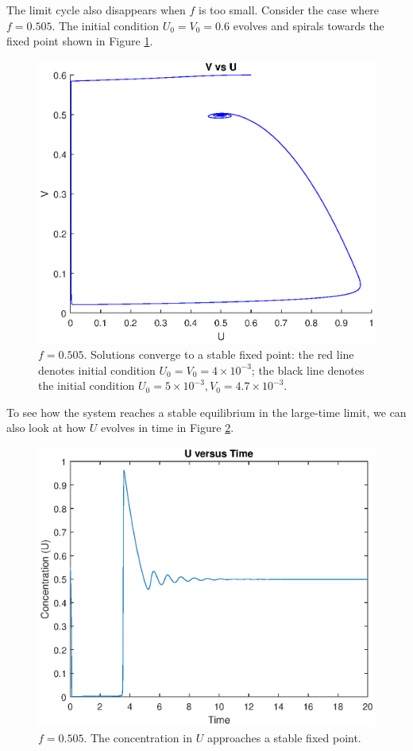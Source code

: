 \documentclass[twocolumn,amsmath,amssymb,aps]{revtex4}
\begin{document}
The limit cycle also disappears when $f$ is too small. Consider the case where $f = 0.505$. The initial condition $U_0 = V_0 = 0.6$ evolves and spirals towards the fixed point shown in Figure \ref{fig:hopf2}.
\begin{figure}[!htb]
	\centering
	\includegraphics[scale=0.48]{hopf2.eps}
	\caption{$f = 0.505$. Solutions converge to a stable fixed point: the red line denotes initial condition $U_0 =V_0 = 4\times 10^{-3}$; the black line denotes the initial condition $U_0 = 5\times 10^{-3}, V_0 = 4.7 \times 10^{-3}$.}
	\label{fig:hopf2}
\end{figure}
To see how the system reaches a stable equilibrium in the large-time limit, we can also look at how $U$ evolves in time in Figure \ref{fig:UEvolves}.
\begin{figure}[!htb]
	\centering
	\includegraphics[scale=0.48]{hopf2_time.eps}
	\caption{$f = 0.505$. The concentration in $U$ approaches a stable fixed point.}
	\label{fig:UEvolves}
\end{figure}
\end{document}
